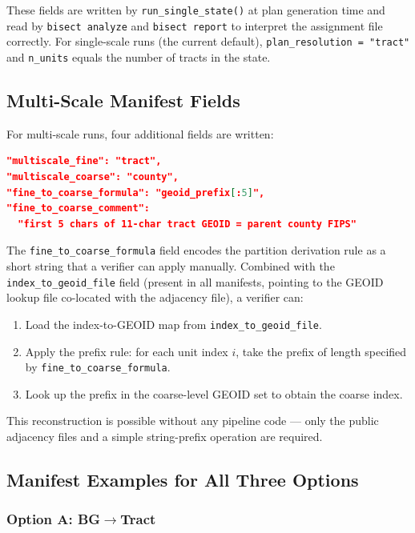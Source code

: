 These fields are written by \texttt{run\_single\_state()} at plan generation
time and read by \texttt{bisect analyze} and \texttt{bisect report} to
interpret the assignment file correctly.
For single-scale runs (the current default), \texttt{plan\_resolution = "tract"}
and \texttt{n\_units} equals the number of tracts in the state.

\subsection{Multi-Scale Manifest Fields}

For multi-scale runs, four additional fields are written:

\begin{lstlisting}[language=json]
"multiscale_fine": "tract",
"multiscale_coarse": "county",
"fine_to_coarse_formula": "geoid_prefix[:5]",
"fine_to_coarse_comment":
  "first 5 chars of 11-char tract GEOID = parent county FIPS"
\end{lstlisting}

\noindent
The \texttt{fine\_to\_coarse\_formula} field encodes the partition derivation
rule as a short string that a verifier can apply manually.
Combined with the \texttt{index\_to\_geoid\_file} field (present in all
manifests, pointing to the GEOID lookup file co-located with the adjacency
file), a verifier can:
\begin{enumerate}
  \item Load the index-to-GEOID map from \texttt{index\_to\_geoid\_file}.
  \item Apply the prefix rule: for each unit index $i$, take the prefix
        of length specified by \texttt{fine\_to\_coarse\_formula}.
  \item Look up the prefix in the coarse-level GEOID set to obtain the
        coarse index.
\end{enumerate}
This reconstruction is possible without any pipeline code --- only the
public adjacency files and a simple string-prefix operation are required.

\subsection{Manifest Examples for All Three Options}

\subsubsection{Option A: BG$\to$Tract}

